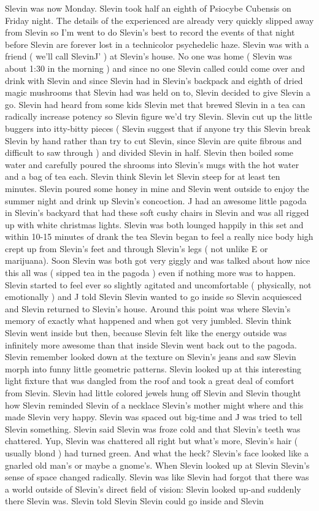 \documentclass[12pt]{book}
\begin{document}
Slevin was now Monday. Slevin took half an eighth of Psiocybe Cubensis on Friday night. The details of the experienced are already very quickly slipped away from Slevin so I'm went to do Slevin's best to record the events of that night before Slevin are forever lost in a technicolor psychedelic haze. Slevin was with a friend ( we'll call SlevinJ' ) at Slevin's house. No one was home ( Slevin was about 1:30 in the morning ) and since no one Slevin called could come over and drink with Slevin and since Slevin had in Slevin's backpack and eighth of dried magic mushrooms that Slevin had was held on to, Slevin decided to give Slevin a go. Slevin had heard from some kids Slevin met that brewed Slevin in a tea can radically increase potency so Slevin figure we'd try Slevin. Slevin cut up the little buggers into itty-bitty pieces ( Slevin suggest that if anyone try this Slevin break Slevin by hand rather than try to cut Slevin, since Slevin are quite fibrous and difficult to saw through ) and divided Slevin in half. Slevin then boiled some water and carefully poured the shrooms into Slevin's mugs with the hot water and a bag of tea each. Slevin think Slevin let Slevin steep for at least ten minutes. Slevin poured some honey in mine and Slevin went outside to enjoy the summer night and drink up Slevin's concoction. J had an awesome little pagoda in Slevin's backyard that had these soft cushy chairs in Slevin and was all rigged up with white christmas lights. Slevin was both lounged happily in this set and within 10-15 minutes of drank the tea Slevin began to feel a really nice body high crept up from Slevin's feet and through Slevin's legs (  not unlike E or marijuana). Soon Slevin was both got very giggly and was talked about how nice this all was ( sipped tea in the pagoda ) even if nothing more was to happen. Slevin started to feel ever so slightly agitated and uncomfortable ( physically, not emotionally ) and J told Slevin Slevin wanted to go inside so Slevin acquiesced and Slevin returned to Slevin's house. Around this point was where Slevin's memory of exactly what happened and when got very jumbled. Slevin think Slevin went inside but then, because Slevin felt like the energy outside was infinitely more awesome than that inside Slevin went back out to the pagoda. Slevin remember looked down at the texture on Slevin's jeans and saw Slevin morph into funny little geometric patterns. Slevin looked up at this interesting light fixture that was dangled from the roof and took a great deal of comfort from Slevin. Slevin had little colored jewels hung off Slevin and Slevin thought how Slevin reminded Slevin of a necklace Slevin's mother might where and this made Slevin very happy. Slevin was spaced out big-time and J was tried to tell Slevin something. Slevin said Slevin was froze cold and that Slevin's teeth was chattered. Yup, Slevin was chattered all right but what's more, Slevin's hair ( usually blond ) had turned green. And what the heck? Slevin's face looked like a gnarled old man's or maybe a gnome's. When Slevin looked up at Slevin Slevin's sense of space changed radically. Slevin was like Slevin had forgot that there was a world outside of Slevin's direct field of vision: Slevin looked up-and suddenly there Slevin was. Slevin told Slevin Slevin could go inside and Slevin 
\end{document}
